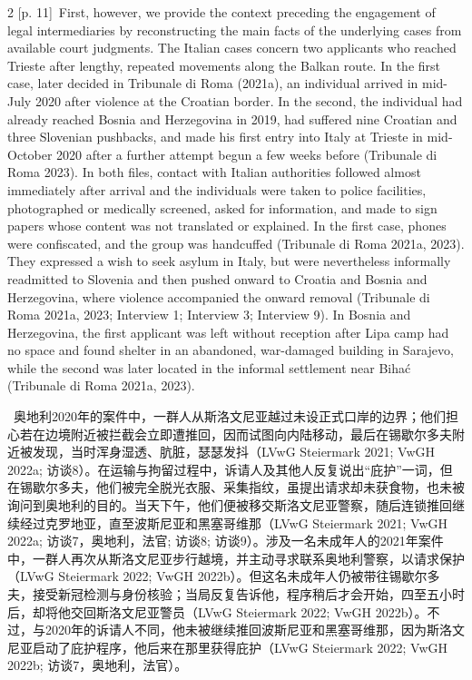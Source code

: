 \documentclass[10pt,a4paper]{article}
\begin{document}
\begin{paracol}{2}
{\scriptsize\color{gray} [p. 11]}\ First, however, we provide the context preceding the engagement of legal intermediaries by reconstructing the main facts of the underlying cases from available court judgments. The Italian cases concern two applicants who reached Trieste after lengthy, repeated movements along the Balkan route. In the first case, later decided in Tribunale di Roma (2021a), an individual arrived in mid-July 2020 after violence at the Croatian border. In the second, the individual had already reached Bosnia and Herzegovina in 2019, had suffered nine Croatian and three Slovenian pushbacks, and made his first entry into Italy at Trieste in mid-October 2020 after a further attempt begun a few weeks before (Tribunale di Roma 2023). In both files, contact with Italian authorities followed almost immediately after arrival and the individuals were taken to police facilities, photographed or medically screened, asked for information, and made to sign papers whose content was not translated or explained. In the first case, phones were confiscated, and the group was handcuffed (Tribunale di Roma 2021a, 2023). They expressed a wish to seek asylum in Italy, but were nevertheless informally readmitted to Slovenia and then pushed onward to Croatia and Bosnia and Herzegovina, where violence accompanied the onward removal (Tribunale di Roma 2021a, 2023; Interview 1; Interview 3; Interview 9). In Bosnia and Herzegovina, the first applicant was left without reception after Lipa camp had no space and found shelter in an abandoned, war-damaged building in Sarajevo, while the second was later located in the informal settlement near Bihać (Tribunale di Roma 2021a, 2023).\par
\switchcolumn*
{\scriptsize\color{gray} [p. 11]}\ 奥地利2020年的案件中，一群人从斯洛文尼亚越过未设正式口岸的边界；他们担心若在边境附近被拦截会立即遭推回，因而试图向内陆移动，最后在锡歇尔多夫附近被发现，当时浑身湿透、肮脏，瑟瑟发抖（LVwG Steiermark 2021; VwGH 2022a; 访谈8）。在运输与拘留过程中，诉请人及其他人反复说出“庇护”一词，但在锡歇尔多夫，他们被完全脱光衣服、采集指纹，虽提出请求却未获食物，也未被询问到奥地利的目的。当天下午，他们便被移交斯洛文尼亚警察，随后连锁推回继续经过克罗地亚，直至波斯尼亚和黑塞哥维那（LVwG Steiermark 2021; VwGH 2022a; 访谈7，奥地利，法官; 访谈8; 访谈9）。涉及一名未成年人的2021年案件中，一群人再次从斯洛文尼亚步行越境，并主动寻求联系奥地利警察，以请求保护（LVwG Steiermark 2022; VwGH 2022b）。但这名未成年人仍被带往锡歇尔多夫，接受新冠检测与身份核验；当局反复告诉他，程序稍后才会开始，四至五小时后，却将他交回斯洛文尼亚警员（LVwG Steiermark 2022; VwGH 2022b）。不过，与2020年的诉请人不同，他未被继续推回波斯尼亚和黑塞哥维那，因为斯洛文尼亚启动了庇护程序，他后来在那里获得庇护（LVwG Steiermark 2022; VwGH 2022b; 访谈7，奥地利，法官）。\par

\end{paracol}
\end{document}
